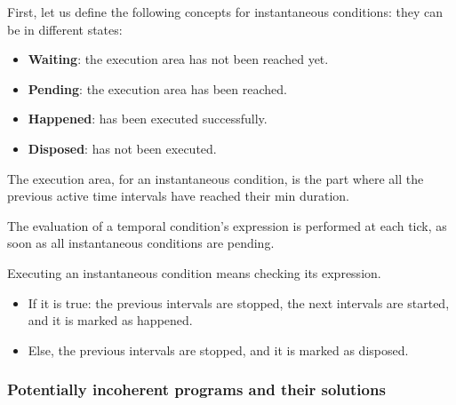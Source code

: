 \documentclass[applsci,article,submit,moreauthors,pdftex,10pt,a4paper]{mdpi}
\begin{document}
First, let us define the following concepts for instantaneous conditions: they can be in different states:
\begin{itemize}
\item \textbf{Waiting}: the execution area has not been reached yet.
\item \textbf{Pending}: the execution area has been reached.
\item \textbf{Happened}: has been executed successfully.
\item \textbf{Disposed}: has not been executed.
\end{itemize}

The execution area, for an instantaneous condition, is the part where all the previous active time intervals have reached their min duration.

The evaluation of a temporal condition's expression is performed at each tick, as soon as all instantaneous conditions are pending. 

Executing an instantaneous condition means checking its expression.
\begin{itemize}
\item If it is true: the previous intervals are stopped, the next intervals are started, and it is marked as happened. 
\item Else, the previous intervals are stopped, and it is marked as disposed.
\end{itemize}

\subsubsection{Potentially incoherent programs and their solutions}
\end{document}
